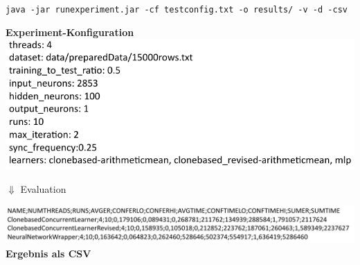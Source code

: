 \documentclass[18pt]{beamer}
\begin{document}
\begin{frame}[allowframebreaks]
		\texttt{{\footnotesize java -jar runexperiment.jar -cf testconfig.txt -o results/ -v -d -csv}}
		\begin{center}
			\textbf{{\tiny Experiment-Konfiguration}}
			\newline
			\includegraphics[scale=0.5]{Grafiken/testconfig}
		\end{center}
		\begin{center}	
			{\huge $\Downarrow$} {\small Evaluation}
		\end{center}
		\begin{center}
			\includegraphics[scale=0.5]{Grafiken/csv}
			\newline
			\textbf{{\tiny Ergebnis als CSV}}
		\end{center}
	\end{frame}
	
\end{document}
